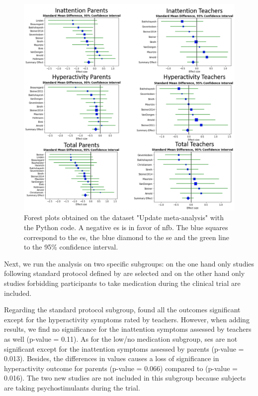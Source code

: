 \begin{figure}[h!]
  \centering
  \includegraphics[width=1.0\linewidth]{figures/meta_review_forest_plots_update_meta_analysis_our_choices_no_colors_2-columns_fitting_image}
  \caption{Forest plots obtained on the dataset "Update meta-analysis" with the Python code. A negative \gls{es} is in favor of \gls{nfb}. 
	The blue squares correspond to the \gls{es}, the blue diamond to the \gls{se} and the green line to the 95\% confidence interval.}
  \label{Figure:meta_review_forest_plots_update_meta_analysis_our_choices_no_colors_2-columns_fitting_image}
\end{figure}

Next, we run the analysis on two specific subgroups: on the one hand only studies following standard protocol defined by \citet{Arns2014}
are selected and on the other hand only studies forbidding participants to take medication during the clinical trial are included. 

Regarding the standard protocol subgroup, \citet{Cortese2016} found all the outcomes significant except for the hyperactivity symptoms 
rated by teachers. However, when adding \citep{Strehl2017} results, we find no significance for the inattention symptoms assessed by 
teachers as well (p-value = 0.11). 
As for the low/no medication subgroup, \glspl{se} are not significant except for the inattention symptoms assessed by parents (p-value = 0.013). 
Besides, the differences in \citet{Arnold2014} values causes a loss of significance in 
hyperactivity outcome for parents (p-value = 0.066) compared to \citet{Cortese2016} (p-value = 0.016). The two new studies are not 
included in this subgroup because subjects are taking psychostimulants during the trial.

